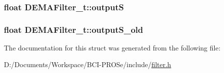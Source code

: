 \subsubsection[{\texorpdfstring{outputS}{outputS}}]{\setlength{\rightskip}{0pt plus 5cm}float D\+E\+M\+A\+Filter\+\_\+t\+::outputS}\hypertarget{struct_d_e_m_a_filter__t_a7186031f6e4eff42efc07d00ef4873f2}{}\label{struct_d_e_m_a_filter__t_a7186031f6e4eff42efc07d00ef4873f2}
\subsubsection[{\texorpdfstring{output\+S\+\_\+old}{outputS_old}}]{\setlength{\rightskip}{0pt plus 5cm}float D\+E\+M\+A\+Filter\+\_\+t\+::output\+S\+\_\+old}\hypertarget{struct_d_e_m_a_filter__t_a55e36118f319088c742f321f1af24251}{}\label{struct_d_e_m_a_filter__t_a55e36118f319088c742f321f1af24251}


The documentation for this struct was generated from the following file\+:\begin{DoxyCompactItemize}
\item 
D\+:/\+Documents/\+Workspace/\+B\+C\+I-\/\+P\+R\+O\+Se/include/\hyperlink{filter_8h}{filter.\+h}\end{DoxyCompactItemize}
